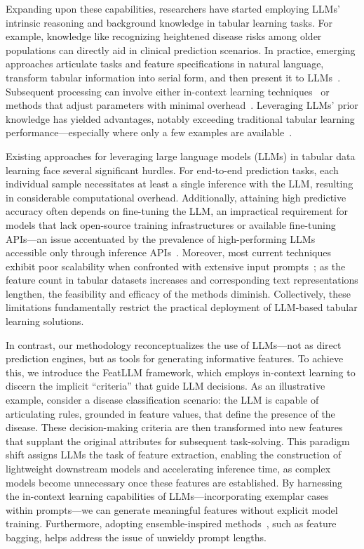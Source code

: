 Expanding upon these capabilities, researchers have started employing LLMs’ intrinsic reasoning and background knowledge in tabular learning tasks. For example, knowledge like recognizing heightened disease risks among older populations can directly aid in clinical prediction scenarios. In practice, emerging approaches articulate tasks and feature specifications in natural language, transform tabular information into serial form, and then present it to LLMs~\cite{dinh2022lift,wang2023anypredict}. Subsequent processing can involve either in-context learning techniques~\cite{nam2023semi} or methods that adjust parameters with minimal overhead~\cite{dinh2022lift,hegselmann2023tabllm}. Leveraging LLMs’ prior knowledge has yielded advantages, notably exceeding traditional tabular learning performance—especially where only a few examples are available~\cite{hegselmann2023tabllm}.

Existing approaches for leveraging large language models (LLMs) in tabular data learning face several significant hurdles. For end-to-end prediction tasks, each individual sample necessitates at least a single inference with the LLM, resulting in considerable computational overhead. Additionally, attaining high predictive accuracy often depends on fine-tuning the LLM, an impractical requirement for models that lack open-source training infrastructures or available fine-tuning APIs—an issue accentuated by the prevalence of high-performing LLMs accessible only through inference APIs~\cite{anil2023palm,openai2023gpt4}. Moreover, most current techniques exhibit poor scalability when confronted with extensive input prompts~\cite{liu2023lost}; as the feature count in tabular datasets increases and corresponding text representations lengthen, the feasibility and efficacy of the methods diminish. Collectively, these limitations fundamentally restrict the practical deployment of LLM-based tabular learning solutions.

In contrast, our methodology reconceptualizes the use of LLMs—not as direct prediction engines, but as tools for generating informative features. To achieve this, we introduce the \textsf{FeatLLM} framework, which employs in-context learning to discern the implicit ``criteria'' that guide LLM decisions. As an illustrative example, consider a disease classification scenario: the LLM is capable of articulating rules, grounded in feature values, that define the presence of the disease. These decision-making criteria are then transformed into new features that supplant the original attributes for subsequent task-solving. This paradigm shift assigns LLMs the task of feature extraction, enabling the construction of lightweight downstream models and accelerating inference time, as complex models become unnecessary once these features are established. By harnessing the in-context learning capabilities of LLMs—incorporating exemplar cases within prompts—we can generate meaningful features without explicit model training. Furthermore, adopting ensemble-inspired methods~\cite{breiman2001random}, such as feature bagging, helps address the issue of unwieldy prompt lengths.

